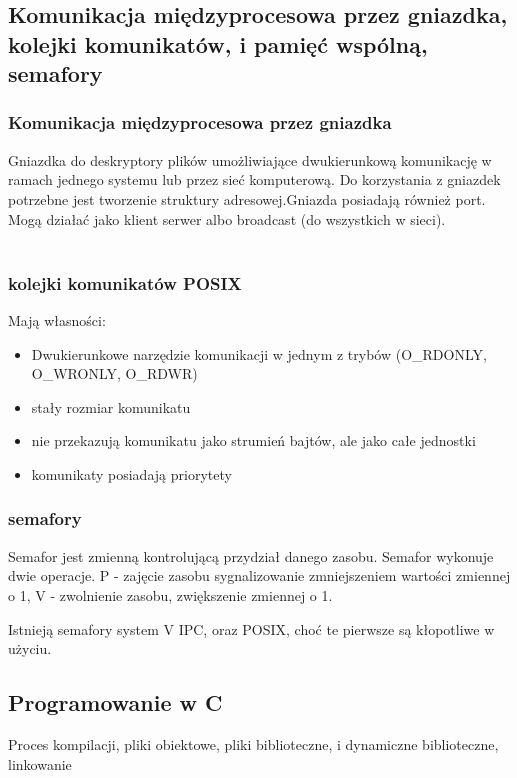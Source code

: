 \documentclass[a4paper,twoside]{report}
\begin{document}
\subsection{Komunikacja międzyprocesowa przez gniazdka, kolejki komunikatów, i pamięć wspólną, semafory}  

\subsubsection{Komunikacja międzyprocesowa przez gniazdka}

Gniazdka do deskryptory plików umożliwiające dwukierunkową komunikację w ramach jednego systemu lub przez sieć komputerową. Do korzystania z gniazdek potrzebne jest tworzenie struktury adresowej.Gniazda posiadają również port. Mogą działać jako klient serwer albo broadcast (do wszystkich w sieci).\\
\\
\subsubsection{kolejki komunikatów POSIX}
Mają własności: 
\begin{itemize}
	\item Dwukierunkowe narzędzie komunikacji w jednym z trybów (O\_RDONLY, O\_WRONLY, O\_RDWR)
	\item stały rozmiar komunikatu
	\item nie przekazują komunikatu jako strumień bajtów, ale jako całe jednostki
	\item komunikaty posiadają priorytety
\end{itemize}


\subsubsection{semafory}
Semafor jest zmienną kontrolującą przydział danego zasobu. Semafor wykonuje dwie operacje. P - zajęcie zasobu sygnalizowanie zmniejszeniem wartości zmiennej o 1, V - zwolnienie zasobu, zwiększenie zmiennej o 1.

Istnieją semafory system V IPC, oraz POSIX, choć te pierwsze są kłopotliwe w użyciu.

\subsection{Programowanie w C}

Proces kompilacji, pliki obiektowe,  pliki biblioteczne, i dynamiczne biblioteczne, linkowanie
\end{document}
